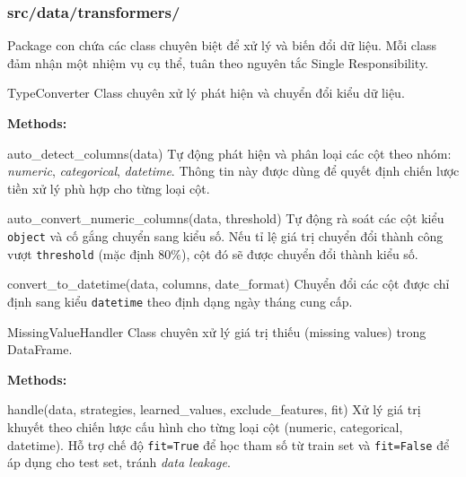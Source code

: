 \documentclass[12pt,a4paper]{article}
\newenvironment{methodlist}{
    \begin{description}[style=nextline, font=\ttfamily\color{sklearn-blue}]
}{
    \end{description}
}
\begin{document}
\subsubsection{src/data/transformers/}

Package con chứa các class chuyên biệt để xử lý và biến đổi dữ liệu. Mỗi class đảm nhận một nhiệm vụ cụ thể, tuân theo nguyên tắc Single Responsibility.

\begin{classbox}{TypeConverter}
Class chuyên xử lý phát hiện và chuyển đổi kiểu dữ liệu.

\vspace{0.2cm}
\textbf{Methods:}
\begin{methodlist}
    \item[auto\_detect\_columns(data)] 
    Tự động phát hiện và phân loại các cột theo nhóm: \textit{numeric}, \textit{categorical}, \textit{datetime}. 
    Thông tin này được dùng để quyết định chiến lược tiền xử lý phù hợp cho từng loại cột.
    
    \item[auto\_convert\_numeric\_columns(data, threshold)] 
    Tự động rà soát các cột kiểu \texttt{object} và cố gắng chuyển sang kiểu số. 
    Nếu tỉ lệ giá trị chuyển đổi thành công vượt \texttt{threshold} (mặc định 80\%), cột đó sẽ được chuyển đổi thành kiểu số.
    
    \item[convert\_to\_datetime(data, columns, date\_format)] 
    Chuyển đổi các cột được chỉ định sang kiểu \texttt{datetime} theo định dạng ngày tháng cung cấp.
\end{methodlist}
\end{classbox}

\begin{classbox}{MissingValueHandler}
Class chuyên xử lý giá trị thiếu (missing values) trong DataFrame.

\vspace{0.2cm}
\textbf{Methods:}
\begin{methodlist}
    \item[handle(data, strategies, learned\_values, exclude\_features, fit)] 
    Xử lý giá trị khuyết theo chiến lược cấu hình cho từng loại cột (numeric, categorical, datetime). 
    Hỗ trợ chế độ \texttt{fit=True} để học tham số từ train set và \texttt{fit=False} để áp dụng cho test set, tránh \textit{data leakage}.
\end{methodlist}
\end{classbox}
\end{document}
